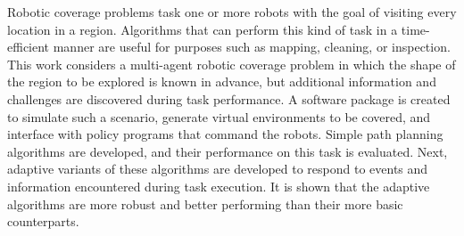 Robotic coverage problems task one or more robots with the goal of visiting every location in a region. Algorithms that can perform this kind of task in a time-efficient manner are useful for purposes such as mapping, cleaning, or inspection. This work considers a multi-agent robotic coverage problem in which the shape of the region to be explored is known in advance, but additional information and challenges are discovered during task performance. A software package is created to simulate such a scenario, generate virtual environments to be covered, and interface with policy programs that command the robots. Simple path planning algorithms are developed, and their performance on this task is evaluated. Next, adaptive variants of these algorithms are developed to respond to events and information encountered during task execution. It is shown that the adaptive algorithms are more robust and better performing than their more basic counterparts.